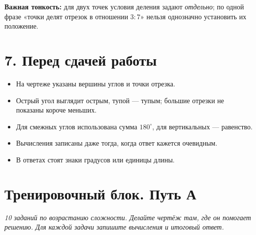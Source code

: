 \documentclass[a4paper,12pt]{article}
\newcommand{\headingrule}{\vspace{-0.45em}{\color{accent}\hrule height 0.55pt}\vspace{0.55em}}
\newcommand{\key}[1]{\textbf{\color{darkaccent}#1}}
\begin{document}
\key{Важная тонкость:} для двух точек условия деления задают \emph{отдельно}; по одной фразе «точки делят отрезок в отношении $3:7$» нельзя однозначно установить их положение.

\section*{7. Перед сдачей работы}
\headingrule
\begin{itemize}
\item[$\square$] На чертеже указаны вершины углов и точки отрезка.
\item[$\square$] Острый угол выглядит острым, тупой --- тупым; большие отрезки не показаны короче меньших.
\item[$\square$] Для смежных углов использована сумма $180^\circ$, для вертикальных --- равенство.
\item[$\square$] Вычисления записаны даже тогда, когда ответ кажется очевидным.
\item[$\square$] В ответах стоят знаки градусов или единицы длины.
\end{itemize}

\clearpage
\section*{Тренировочный блок. Путь А}
\headingrule
\textit{10 заданий по возрастанию сложности. Делайте чертёж там, где он помогает решению. Для каждой задачи запишите вычисления и итоговый ответ.}
\end{document}
